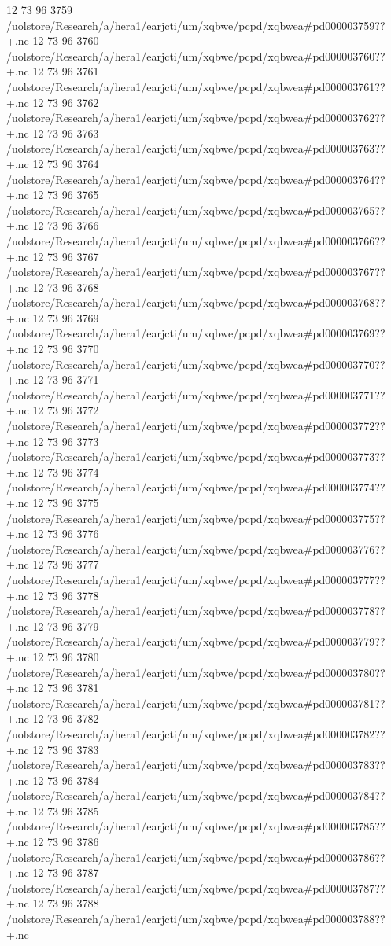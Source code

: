 12 73 96
3759
/uolstore/Research/a/hera1/earjcti/um/xqbwe/pcpd/xqbwea#pd000003759??+.nc
12 73 96
3760
/uolstore/Research/a/hera1/earjcti/um/xqbwe/pcpd/xqbwea#pd000003760??+.nc
12 73 96
3761
/uolstore/Research/a/hera1/earjcti/um/xqbwe/pcpd/xqbwea#pd000003761??+.nc
12 73 96
3762
/uolstore/Research/a/hera1/earjcti/um/xqbwe/pcpd/xqbwea#pd000003762??+.nc
12 73 96
3763
/uolstore/Research/a/hera1/earjcti/um/xqbwe/pcpd/xqbwea#pd000003763??+.nc
12 73 96
3764
/uolstore/Research/a/hera1/earjcti/um/xqbwe/pcpd/xqbwea#pd000003764??+.nc
12 73 96
3765
/uolstore/Research/a/hera1/earjcti/um/xqbwe/pcpd/xqbwea#pd000003765??+.nc
12 73 96
3766
/uolstore/Research/a/hera1/earjcti/um/xqbwe/pcpd/xqbwea#pd000003766??+.nc
12 73 96
3767
/uolstore/Research/a/hera1/earjcti/um/xqbwe/pcpd/xqbwea#pd000003767??+.nc
12 73 96
3768
/uolstore/Research/a/hera1/earjcti/um/xqbwe/pcpd/xqbwea#pd000003768??+.nc
12 73 96
3769
/uolstore/Research/a/hera1/earjcti/um/xqbwe/pcpd/xqbwea#pd000003769??+.nc
12 73 96
3770
/uolstore/Research/a/hera1/earjcti/um/xqbwe/pcpd/xqbwea#pd000003770??+.nc
12 73 96
3771
/uolstore/Research/a/hera1/earjcti/um/xqbwe/pcpd/xqbwea#pd000003771??+.nc
12 73 96
3772
/uolstore/Research/a/hera1/earjcti/um/xqbwe/pcpd/xqbwea#pd000003772??+.nc
12 73 96
3773
/uolstore/Research/a/hera1/earjcti/um/xqbwe/pcpd/xqbwea#pd000003773??+.nc
12 73 96
3774
/uolstore/Research/a/hera1/earjcti/um/xqbwe/pcpd/xqbwea#pd000003774??+.nc
12 73 96
3775
/uolstore/Research/a/hera1/earjcti/um/xqbwe/pcpd/xqbwea#pd000003775??+.nc
12 73 96
3776
/uolstore/Research/a/hera1/earjcti/um/xqbwe/pcpd/xqbwea#pd000003776??+.nc
12 73 96
3777
/uolstore/Research/a/hera1/earjcti/um/xqbwe/pcpd/xqbwea#pd000003777??+.nc
12 73 96
3778
/uolstore/Research/a/hera1/earjcti/um/xqbwe/pcpd/xqbwea#pd000003778??+.nc
12 73 96
3779
/uolstore/Research/a/hera1/earjcti/um/xqbwe/pcpd/xqbwea#pd000003779??+.nc
12 73 96
3780
/uolstore/Research/a/hera1/earjcti/um/xqbwe/pcpd/xqbwea#pd000003780??+.nc
12 73 96
3781
/uolstore/Research/a/hera1/earjcti/um/xqbwe/pcpd/xqbwea#pd000003781??+.nc
12 73 96
3782
/uolstore/Research/a/hera1/earjcti/um/xqbwe/pcpd/xqbwea#pd000003782??+.nc
12 73 96
3783
/uolstore/Research/a/hera1/earjcti/um/xqbwe/pcpd/xqbwea#pd000003783??+.nc
12 73 96
3784
/uolstore/Research/a/hera1/earjcti/um/xqbwe/pcpd/xqbwea#pd000003784??+.nc
12 73 96
3785
/uolstore/Research/a/hera1/earjcti/um/xqbwe/pcpd/xqbwea#pd000003785??+.nc
12 73 96
3786
/uolstore/Research/a/hera1/earjcti/um/xqbwe/pcpd/xqbwea#pd000003786??+.nc
12 73 96
3787
/uolstore/Research/a/hera1/earjcti/um/xqbwe/pcpd/xqbwea#pd000003787??+.nc
12 73 96
3788
/uolstore/Research/a/hera1/earjcti/um/xqbwe/pcpd/xqbwea#pd000003788??+.nc
